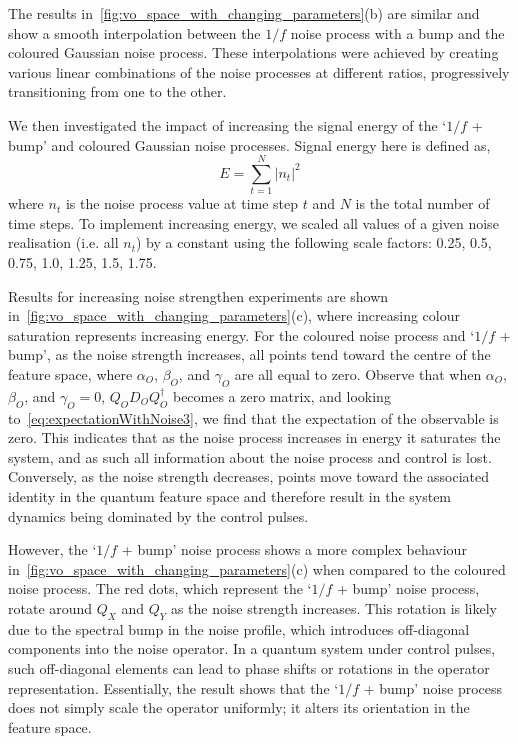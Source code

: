 \documentclass[12pt]{iopart}
\begin{document}
The results in~\cref{fig:vo_space_with_changing_parameters}(b) are similar and show a smooth interpolation between the $1/f$ noise process with a bump and the coloured Gaussian noise process. These interpolations were achieved by creating various linear combinations of the noise processes at different ratios, progressively transitioning from one to the other.

We then investigated the impact of increasing the signal energy of the `$1/f$ + bump' and coloured Gaussian noise processes.  Signal energy here is defined as,
\begin{equation}
    \label{eq:signal_energy}
 E = \sum_{t=1}^{N} \left|n_t\right|^2
\end{equation}
where $n_t$ is the noise process value at time step $t$ and $N$ is the total number of time steps. To implement increasing energy, we scaled all values of a given noise realisation (i.e. all $n_t$) by a constant using the following scale factors: 0.25, 0.5, 0.75, 1.0, 1.25, 1.5, 1.75.

Results for increasing noise strengthen experiments are shown in~\cref{fig:vo_space_with_changing_parameters}(c), where increasing colour saturation represents increasing energy. For the coloured noise process and `$1/f$ + bump', as the noise strength increases, all points tend toward the centre of the feature space, where $\alpha_O$, $\beta_O$, and $\gamma_O$ are all equal to zero. Observe that when $\alpha_O$, $\beta_O$, and $\gamma_O = 0$, $Q_OD_OQ_O^{\dagger}$ becomes a zero matrix, and looking to~\cref{eq:expectationWithNoise3}, we find that the expectation of the observable is zero. This indicates that as the noise process increases in energy it saturates the system, and as such all information about the noise process and control is lost. Conversely, as the noise strength decreases, points move toward the associated identity in the quantum feature space and therefore result in the system dynamics being dominated by the control pulses.

However, the `$1/f$ + bump' noise process shows a more complex behaviour in~\cref{fig:vo_space_with_changing_parameters}(c) when compared to the coloured noise process. The red dots, which represent the `$1/f$ + bump' noise process, rotate around $Q_X$ and $Q_Y$ as the noise strength increases. This rotation is likely due to the spectral bump in the noise profile, which introduces off-diagonal components into the noise operator. In a quantum system under control pulses, such off-diagonal elements can lead to phase shifts or rotations in the operator representation. Essentially, the result shows that the `$1/f$ + bump' noise process does not simply scale the operator uniformly; it alters its orientation in the feature space.
\end{document}
